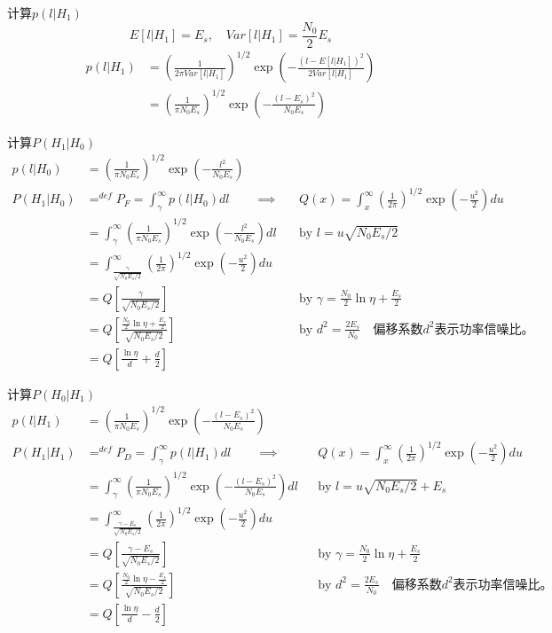\begin{frame}{计算$p(l|H_1)$}
\[ E[l|H_1]=E_s,\quad Var[l|H_1]=\frac{N_0}{2}E_s \]
\begin{align*}
	p(l|H_1)&=\left(\frac{1}{2\pi Var[l|H_1]}\right)^{1/2}\exp\left(-\frac{(l-E[l|H_1])^2}{2Var[l|H_1]}\right)\\
	&=\left(\frac{1}{\pi N_0E_s}\right)^{1/2}\exp\left(-\frac{(l-E_s)^2}{N_0E_s}\right)
\end{align*}
\end{frame}

\begin{frame}[shrink]{计算$P(H_1|H_0)$}
\begin{align*}
p(l|H_0)&=\left(\frac{1}{\pi N_0E_s}\right)^{1/2}\exp\left(-\frac{l^2}{N_0E_s}\right)\\
P(H_1|H_0)&\mathop{=}^{def}P_F=\int_{\gamma}^{\infty}p(l|H_0)dl\qquad \implies&& Q(x)=\int_{x}^{\infty}\left(\frac{1}{2\pi}\right)^{1/2}\exp\left(-\frac{u^2}{2}\right)du\\
&=\int_{\gamma}^{\infty}\left(\frac{1}{\pi N_0E_s}\right)^{1/2}\exp\left(-\frac{l^2}{N_0E_s}\right)dl&&\text{by }l=u\sqrt{N_0E_s/2}\\
&=\int_{\frac{\gamma}{\sqrt{N_0E_s/2}}}^{\infty}\left(\frac{1}{2\pi}\right)^{1/2}\exp\left(-\frac{u^2}{2}\right)du\\
&=Q\left[\frac{\gamma}{\sqrt{N_0E_s/2}}\right]&&\text{by }\gamma=\frac{N_0}{2}\ln\eta+\frac{E_s}{2}\\
&=Q\left[\frac{\frac{N_0}{2}\ln\eta+\frac{E_s}{2}}{\sqrt{N_0E_s/2}}\right]&&\text{by }d^2=\frac{2E_s}{N_0}\quad \text{偏移系数$d^2$表示功率信噪比。}\\
&=Q\left[\frac{\ln\eta}{d}+\frac{d}{2}\right] 
\end{align*}
\end{frame}

\begin{frame}[shrink]{计算$P(H_0|H_1)$}
\begin{align*}
p(l|H_1)&=\left(\frac{1}{\pi N_0E_s}\right)^{1/2}\exp\left(-\frac{(l-E_s)^2}{N_0E_s}\right)\\
P(H_1|H_1)&\mathop{=}^{def}P_D=\int_{\gamma}^{\infty}p(l|H_1)dl\qquad \implies&& Q(x)=\int_{x}^{\infty}\left(\frac{1}{2\pi}\right)^{1/2}\exp\left(-\frac{u^2}{2}\right)du\\
&=\int_{\gamma}^{\infty}\left(\frac{1}{\pi N_0E_s}\right)^{1/2}\exp\left(-\frac{(l-E_s)^2}{N_0E_s}\right)dl&&\text{by }l=u\sqrt{N_0E_s/2}+E_s\\
&=\int_{\frac{\gamma-E_s}{\sqrt{N_0E_s/2}}}^{\infty}\left(\frac{1}{2\pi}\right)^{1/2}\exp\left(-\frac{u^2}{2}\right)du\\
&=Q\left[\frac{\gamma-E_s}{\sqrt{N_0E_s/2}}\right]&&\text{by }\gamma=\frac{N_0}{2}\ln\eta+\frac{E_s}{2}\\
&=Q\left[\frac{\frac{N_0}{2}\ln\eta-\frac{E_s}{2}}{\sqrt{N_0E_s/2}}\right]&&\text{by }d^2=\frac{2E_s}{N_0}\quad \text{偏移系数$d^2$表示功率信噪比。}\\
&=Q\left[\frac{\ln\eta}{d}-\frac{d}{2}\right]
\end{align*}
\end{frame}
